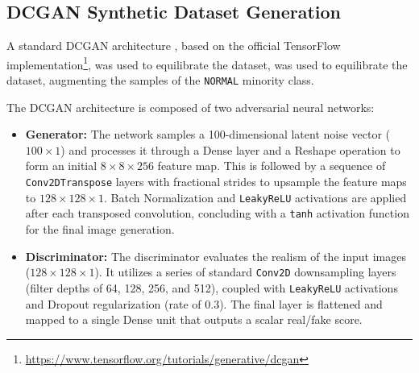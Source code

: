 \subsection{DCGAN Synthetic Dataset Generation}
\label{sec:dcgan_architecture}

A standard DCGAN architecture \cite{Radford2015DCGAN}, based on the official 
TensorFlow implementation\footnote{\url{https://www.tensorflow.org/tutorials/generative/dcgan}}, 
was used to equilibrate the dataset, was used to equilibrate the
dataset, augmenting the samples of the \texttt{NORMAL} minority class.

The DCGAN architecture is composed of two adversarial neural networks:
\begin{itemize}
\item \textbf{Generator:} The network samples a 100-dimensional
  latent noise vector ($100 \times 1$) and processes it through a
  Dense layer and a Reshape operation to form an initial $8 \times
  8 \times 256$ feature map. This is followed by a sequence of
  \texttt{Conv2DTranspose} layers with fractional strides to
  upsample the feature maps to $128 \times 128 \times 1$. Batch
  Normalization and \texttt{LeakyReLU} activations are applied
  after each transposed convolution, concluding with a
  \texttt{tanh} activation function for the final image
  generation.
  
\item \textbf{Discriminator:} The discriminator evaluates the
  realism of the input images ($128 \times 128 \times 1$). It
  utilizes a series of standard \texttt{Conv2D} downsampling
  layers (filter depths of 64, 128, 256, and 512), coupled with
  \texttt{LeakyReLU} activations and Dropout regularization (rate
  of 0.3). The final layer is flattened and mapped to a single
  Dense unit that outputs a scalar real/fake score.      
\end{itemize}


